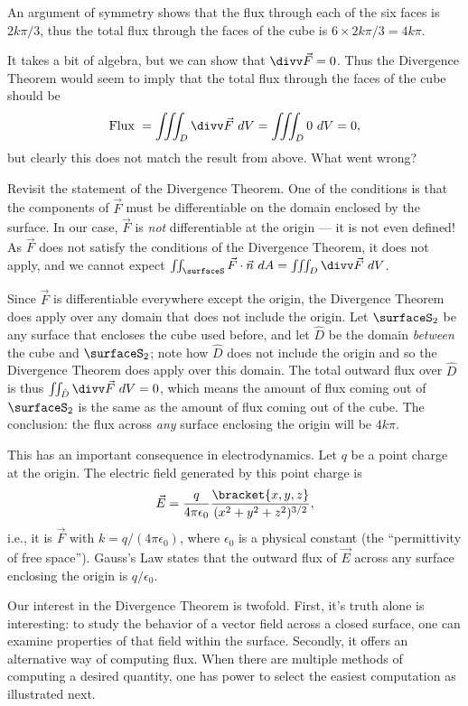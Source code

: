 \begin{example}
An argument of symmetry shows that the flux through each of the six faces is $2k\pi/3$, thus the total flux through the faces of the cube is $6\times2k\pi/3 = 4k\pi$.

It takes a bit of algebra, but we can show that $\divv\vec F = 0$. Thus the Divergence Theorem would seem to imply that the total flux through the faces of the cube should be 
\[\text{Flux }=\iiint_D \divv \vec F\ dV = \iiint_D 0\ dV = 0,\]
but clearly this does not match the result from above. What went wrong?

Revisit the statement of the Divergence Theorem. One of the conditions is that the components of $\vec F$ must be differentiable on the domain enclosed by the surface. In our case, $\vec F$ is \emph{not} differentiable at the origin --- it is not even defined! As $\vec F$ does not satisfy the conditions of the Divergence Theorem, it does not apply, and we cannot expect $\iint_\surfaceS \vec F\cdot\vec n\ dA = \iiint_D \divv\vec F\ dV$.

Since $\vec F$ is differentiable everywhere except the origin, the Divergence Theorem does apply over any domain that does not include the origin. Let $\surfaceS_2$ be any surface that encloses the cube used before, and let $\hat D$ be the domain \emph{between} the cube and $\surfaceS_2$; note how $\hat D$ does not include the origin and so the Divergence Theorem does apply over this domain. The total outward flux over $\hat D$ is thus $\iint_{\hat D}\divv \vec F\ dV = 0$, which means the amount of flux coming out of $\surfaceS_2$ is the same as the amount of flux coming out of the cube. The conclusion: the flux across \emph{any} surface enclosing the origin will be $4k\pi$. 

This has an important consequence in electrodynamics. Let $q$ be a point charge at the origin. The electric field generated by this point charge is 
\[\vec E = \frac{q}{4\pi \epsilon_0}\frac{\bracket{x,y,z}}{(x^2+y^2+z^2)^{3/2}},\]
i.e., it is $\vec F$ with $k = q/(4\pi \epsilon_0)$, where $\epsilon_0$ is a physical constant (the ``permittivity of free space''). Gauss's Law states that the outward flux of $\vec E$ across any surface enclosing the origin is $q/\epsilon_0$.
\end{example}

Our interest in the Divergence Theorem is twofold. First, it's truth alone is interesting: to study the behavior of a vector field across a closed surface, one can examine properties of that field within the surface. Secondly, it offers an alternative way of computing flux. When there are multiple methods of computing a desired quantity, one has power to select the easiest computation as illustrated next.

